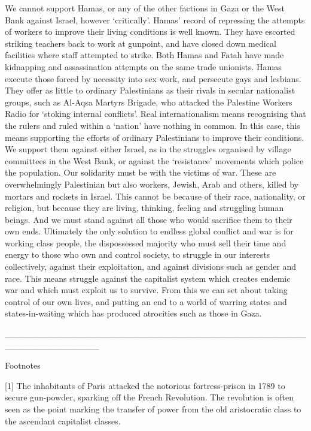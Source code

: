 We cannot support Hamas, or any of the other factions in Gaza or the West Bank
against Israel, however ‘critically’.
Hamas’ record of repressing the attempts of workers
to improve their living conditions is well known.
They have escorted striking teachers
back to work at gunpoint, and have closed down medical facilities where staff attempted
to strike.
Both Hamas and Fatah have made kidnapping and assassination attempts on
the same trade unionists.
Hamas execute those forced by necessity into sex work, and
persecute gays and lesbians.
They offer as little to ordinary Palestinians as their rivals in
secular nationalist groups, such as Al-Aqsa Martyrs Brigade, who attacked the Palestine
Workers Radio for ‘stoking internal conflicts’.
Real internationalism means recognising
that the rulers and ruled within a ‘nation’ have nothing in common.
In this case, this
means supporting the efforts of ordinary Palestinians to improve their conditions.
We
support them against either Israel, as in the struggles organised by village committees in
the West Bank, or against the ‘resistance’ movements which police the population.
Our solidarity must be with the victims of war.
These are overwhelmingly Palestinian
but also workers, Jewish, Arab and others, killed by mortars and rockets in Israel.
This cannot be because of their race, nationality, or religion, but because they are living,
thinking, feeling and struggling human beings.
And we must stand against all those who
would sacrifice them to their own ends.
Ultimately the only solution to endless global
conflict and war is for working class people, the dispossessed majority who must sell
their time and energy to those who own and control society, to struggle in our interests
collectively, against their exploitation, and against divisions such as gender and race.
This means struggle against the capitalist system which creates endemic war and which
must exploit us to survive.
From this we can set about taking control of our own lives,
and putting an end to a world of warring states and states-in-waiting which has produced
atrocities such as those in Gaza.

_______________________________________________________________

Footnotes

[1] The inhabitants of Paris attacked the notorious fortress-prison in 1789 to secure gun-powder, sparking off the French Revolution.
The revolution is often seen as the point marking the transfer of power from the old aristocratic class to the ascendant capitalist classes.

